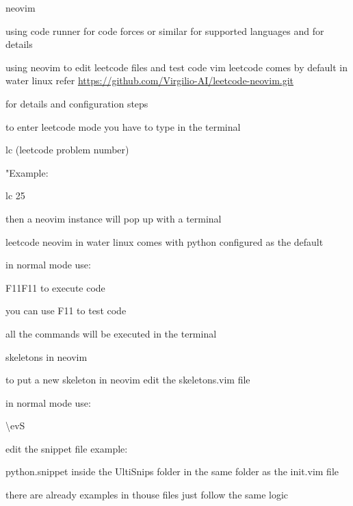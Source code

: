 \begin{section}{neovim}
\begin{subsection}{using code runner for code forces or similar}
		for supported languages and for details

	\end{subsection}
	\begin{subsection}{using neovim to edit leetcode files and test code}
		vim leetcode comes by default in water linux refer \url{https://github.com/Virgilio-AI/leetcode-neovim.git}

		for details and configuration steps

		to enter leetcode mode you have to type in the terminal

		lc (leetcode problem number)

		"Example:

		lc 25

		then a neovim instance will pop up with a terminal

		leetcode neovim in water linux comes with python configured as the default

		in normal mode use:
		
		\<F11\>\<F11\> to execute code

		you can use \<F11\> to test code

		all the commands will be executed in the terminal

	\end{subsection}
	\begin{subsection}{skeletons in neovim}

		to put a new skeleton in neovim edit the skeletons.vim file

		in normal mode use:

		\textbackslash evS

		edit the snippet file example:

		python.snippet inside the UltiSnips folder in the same folder as the init.vim file

		there are already examples in thouse files just follow the same logic

	\end{subsection}
\end{section}


